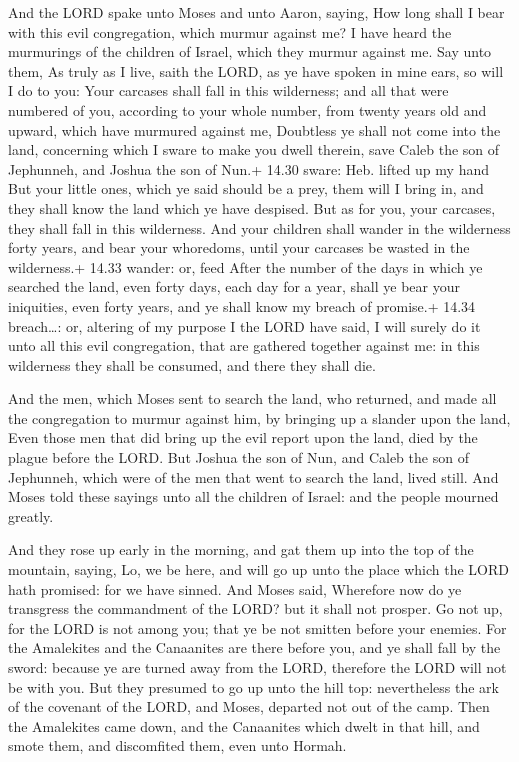  And the LORD spake unto Moses and unto Aaron, saying,
 How long shall I bear with this evil congregation, which
murmur against me? I have heard the murmurings of the children of
Israel, which they murmur against me.  Say unto them, As
truly as I live, saith the LORD, as ye have spoken in mine ears, so will
I do to you:  Your carcases shall fall in this wilderness;
and all that were numbered of you, according to your whole number, from
twenty years old and upward, which have murmured against me,
 Doubtless ye shall not come into the land, concerning
which I sware to make you dwell therein, save Caleb the son of
Jephunneh, and Joshua the son of Nun.+ 14.30 sware: Heb. lifted up my
hand  But your little ones, which ye said should be a prey,
them will I bring in, and they shall know the land which ye have
despised.  But as for you, your carcases, they shall fall
in this wilderness.  And your children shall wander in the
wilderness forty years, and bear your whoredoms, until your carcases be
wasted in the wilderness.+ 14.33 wander: or, feed  After
the number of the days in which ye searched the land, even forty days,
each day for a year, shall ye bear your iniquities, even forty years,
and ye shall know my breach of promise.+ 14.34 breach\ldots: or,
altering of my purpose  I the LORD have said, I will surely
do it unto all this evil congregation, that are gathered together
against me: in this wilderness they shall be consumed, and there they
shall die.

 And the men, which Moses sent to search the land, who
returned, and made all the congregation to murmur against him, by
bringing up a slander upon the land,  Even those men that
did bring up the evil report upon the land, died by the plague before
the LORD.  But Joshua the son of Nun, and Caleb the son of
Jephunneh, which were of the men that went to search the land, lived
still.  And Moses told these sayings unto all the children
of Israel: and the people mourned greatly.

 And they rose up early in the morning, and gat them up
into the top of the mountain, saying, Lo, we be here, and will go up
unto the place which the LORD hath promised: for we have sinned.
 And Moses said, Wherefore now do ye transgress the
commandment of the LORD? but it shall not prosper.  Go not
up, for the LORD is not among you; that ye be not smitten before your
enemies.  For the Amalekites and the Canaanites are there
before you, and ye shall fall by the sword: because ye are turned away
from the LORD, therefore the LORD will not be with you. 
But they presumed to go up unto the hill top: nevertheless the ark of
the covenant of the LORD, and Moses, departed not out of the camp.
 Then the Amalekites came down, and the Canaanites which
dwelt in that hill, and smote them, and discomfited them, even unto
Hormah.

